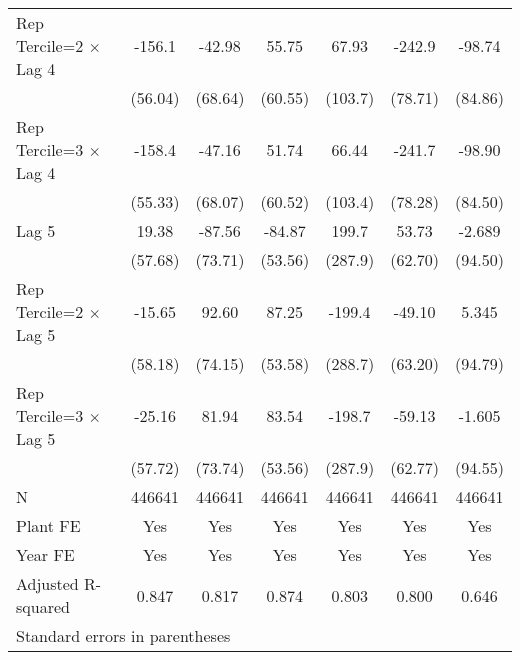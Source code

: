 \begin{table}[htbp]
\begin{tabular}{l*{6}{c}}
\addlinespace
Rep Tercile=2 $\times$ Lag 4&   -156.1\sym{**} &   -42.98         &    55.75         &    67.93         &   -242.9\sym{**} &   -98.74         \\
                &  (56.04)         &  (68.64)         &  (60.55)         &  (103.7)         &  (78.71)         &  (84.86)         \\
\addlinespace
Rep Tercile=3 $\times$ Lag 4&   -158.4\sym{**} &   -47.16         &    51.74         &    66.44         &   -241.7\sym{**} &   -98.90         \\
                &  (55.33)         &  (68.07)         &  (60.52)         &  (103.4)         &  (78.28)         &  (84.50)         \\
\addlinespace
Lag 5           &    19.38         &   -87.56         &   -84.87         &    199.7         &    53.73         &   -2.689         \\
                &  (57.68)         &  (73.71)         &  (53.56)         &  (287.9)         &  (62.70)         &  (94.50)         \\
\addlinespace
Rep Tercile=2 $\times$ Lag 5&   -15.65         &    92.60         &    87.25         &   -199.4         &   -49.10         &    5.345         \\
                &  (58.18)         &  (74.15)         &  (53.58)         &  (288.7)         &  (63.20)         &  (94.79)         \\
\addlinespace
Rep Tercile=3 $\times$ Lag 5&   -25.16         &    81.94         &    83.54         &   -198.7         &   -59.13         &   -1.605         \\
                &  (57.72)         &  (73.74)         &  (53.56)         &  (287.9)         &  (62.77)         &  (94.55)         \\
\midrule
N               &   446641         &   446641         &   446641         &   446641         &   446641         &   446641         \\
Plant FE        &      Yes         &      Yes         &      Yes         &      Yes         &      Yes         &      Yes         \\
Year FE         &      Yes         &      Yes         &      Yes         &      Yes         &      Yes         &      Yes         \\
Adjusted R-squared&    0.847         &    0.817         &    0.874         &    0.803         &    0.800         &    0.646         \\
\bottomrule
\multicolumn{7}{l}{\footnotesize Standard errors in parentheses}\\

\end{tabular}
\end{table}
